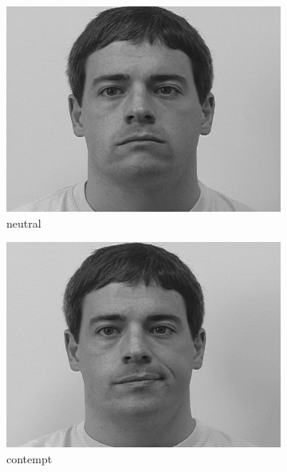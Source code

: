 \begin{figure}%
	\centering
	\begin{subfigure}[b]{0.22\textwidth}
		\includegraphics[width=\textwidth]{./img/dataset/neutral.png}
		\caption{neutral}
		\label{fig:dataset:neutral}
	\end{subfigure}
	\begin{subfigure}[b]{0.22\textwidth}
		\includegraphics[width=\textwidth]{./img/dataset/contempt.png}
		\caption{contempt}
		\label{fig:dataset:contempt}
	\end{subfigure}
	\begin{subfigure}[b]{0.22\textwidth}

\end{subfigure}
\end{figure}
